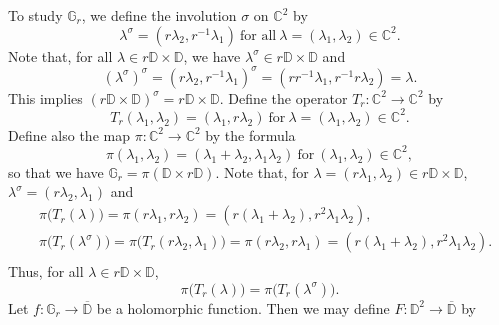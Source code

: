 \documentclass[12pt,reqno]{amsart}
\numberwithin{equation}{section}
\theoremstyle{definition}
\begin{document}
To study $\mathbb{G}_{r}$, we define the involution $\sigma$ on $\mathbb{C}^{2}$ by 
\begin{equation}\label{invol-sigma}
 \lambda^{\sigma} = (r\lambda_{2},r^{-1}\lambda_{1})~ \text{for all}~ \lambda= (\lambda_1, \lambda_2) \in \mathbb{C}^{2}.
 \end{equation}
Note that,  for all $\lambda\in r\mathbb{D}\times \mathbb{D}$, we have $ \lambda^{\sigma}\in r\mathbb{D}\times \mathbb{D}$ and
\begin{equation}\label{sigmainvolutionequation1}
(\lambda^{\sigma})^{\sigma} = (r\lambda_{2},r^{-1}\lambda_{1})^{\sigma} = (rr^{-1}\lambda_{1},r^{-1}r\lambda_{2}) = \lambda.
\end{equation}
This implies $(r\mathbb{D}\times\mathbb{D})^{\sigma} = r\mathbb{D}\times \mathbb{D}.$
Define the operator  $T_{r}:\mathbb{C}^{2} \to \mathbb{C}^{2}$ by 
\begin{equation}\label{Tr-def}
T_{r}(\lambda_{1},\lambda_{2})= (\lambda_{1},r\lambda_{2}) \ \text{for} \ \lambda=(\lambda_{1},\lambda_{2})\in\mathbb{C}^{2}.
\end{equation}
Define also the map $\pi : \mathbb{C}^{2} \rightarrow \mathbb{C}^{2}$ by the formula
\begin{equation}\label{pi-def}
\pi(\lambda_{1},\lambda_{2}) = (\lambda_{1}+\lambda_{2}, \lambda_{1}\lambda_{2}) \ \text{for} \ (\lambda_1, \lambda_2) \in \mathbb{C}^{2},
\end{equation}
so that we have $\mathbb{G}_{r} = \pi(\mathbb{D}\times r\mathbb{D})$. 
Note that, for $\lambda = (r\lambda_{1},\lambda_{2}) \in r\mathbb{D}\times \mathbb{D}$, $\lambda^{\sigma}=(r\lambda_{2},\lambda_{1})$ and
\begin{align*}
& \pi\big(T_{r}(\lambda)\big) = \pi(r\lambda_{1},r\lambda_{2}) = (r(\lambda_{1}+\lambda_{2}),r^{2}\lambda_{1}\lambda_{2}),\\
& \pi\big(T_{r}(\lambda^{\sigma})\big) = \pi\big(T_{r}(r\lambda_{2},\lambda_{1})\big) = \pi(r\lambda_{2},r\lambda_{1})= (r(\lambda_{1}+\lambda_{2}),r^{2}\lambda_{1}\lambda_{2}).\\ 
\end{align*}
Thus, for all $\lambda\in r\mathbb{D}\times\mathbb{D}$,
\begin{equation}\label{piTrequation}
\pi\big(T_{r}(\lambda)\big) =  \pi\big(T_{r}(\lambda^{\sigma})\big).
\end{equation}
Let $f : \mathbb{G}_{r} \to \overline{\mathbb{D}}$ be a holomorphic function. Then we may define $F:\mathbb{D}^{2}\rightarrow\overline{\mathbb{D}}$ by
\end{document}
